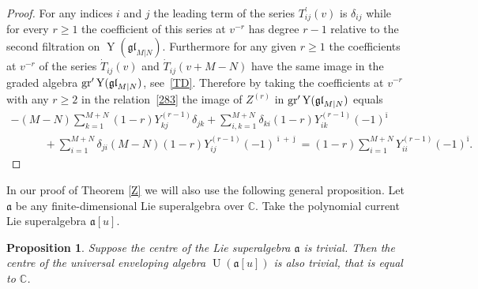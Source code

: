 \documentclass[10pt,a4paper]{amsart}
\numberwithin{equation}{section}
\newtheorem{Proposition}[Theorem]{Proposition}
\def\a{\mathfrak{a}}
\def\bi{{\bar\imath }}
\def\bj{{\bar\jmath }}
\def\CC{{\mathbb{C}}}
\def\de{\delta}
\def\ge{\geqslant}
\def\glMN{\mathfrak{gl}_{M|N}}
\def\grpr{{\rm gr}^{\prime} }
\def\TD{\dot{T}}
\def\TP{T^{\prime}}
\def\Ua{\operatorname{U}(\a [u])}
\def\YMN{\operatorname{Y}(\glMN)}
\begin{document}
\begin{proof}
For any indices $i$ and $j$ the leading term of the series $\TP_{ij}(v)$
is $\de_{ij}$ while for every $r\ge1$ the coefficient of this series at
$v^{-r}$ has degree $r-1$ relative to the second filtration on $\YMN $.
Furthermore for any given $r\ge1$
the coefficients at $v^{-r}$ of the series
$\TD_{ij}(v)$ and $\TD_{ij}(v+M-N)$ have the same image
in the graded algebra $\grpr\YMN $, see~\eqref{TD}.
Therefore by
taking the coefficients at $v^{-r}$ with any $r\ge2$
in the relation~\eqref{283}
the image of $Z^{(r)}$ in $\grpr\YMN$ equals
\begin{gather*}
 -(M-N)\sum_{k=1}^{M+N}(1-r) Y^{(r-1)}_{kj} \de_{jk} +
\sum_{i,k=1}^{M+N}
\de_{ki} (1-r) Y^{(r-1)}_{ik} (-1)^{\bi}\\
\qquad\quad{} +
\sum_{i=1}^{M+N}
\de_{ji} (M-N) (1-r) Y^{(r-1)}_{ij} (-1)^{\bi+ \bj}
=
( 1-r ) \sum_{i=1}^{M+N} Y^{(r-1)}_{ii} (-1)^{\bi} .
\tag*{\qed}
\end{gather*}
\renewcommand{\qed}{}
\end{proof}

In our proof of Theorem \ref{Z} we will also use the following general
proposition.
Let $\a$ be any finite-dimensional Lie superalgebra over $\CC$.
Take the %
polynomial current Lie superalgebra $\a [u] $.

\begin{Proposition}
\label{L27}
Suppose the centre of the Lie superalgebra $\a$ is trivial.
Then the centre of the universal enveloping algebra $\Ua$
is also trivial, that is equal to $\CC $.
\end{Proposition}
\end{document}
